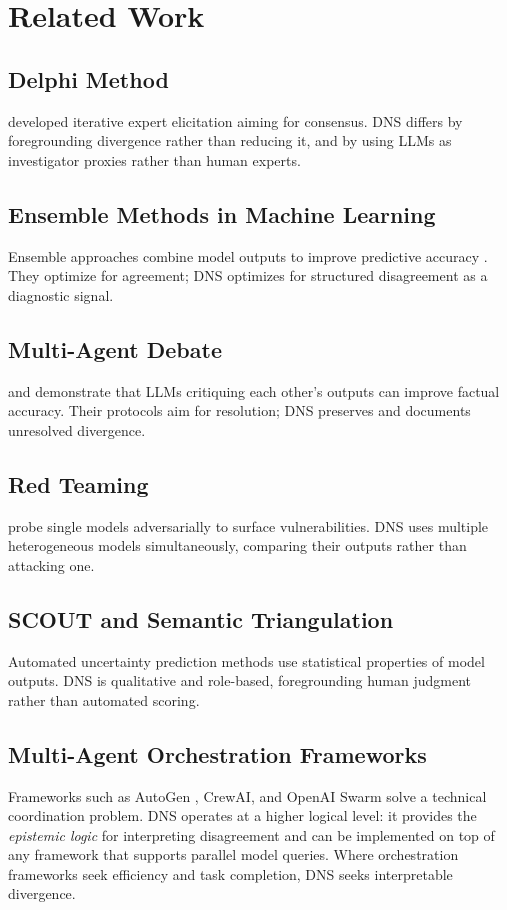 \documentclass[10pt,a4paper]{article}
\begin{document}
\section{Related Work}
\label{sec:related}

\subsection{Delphi Method}
\citet{dalkey1963} developed iterative expert elicitation aiming for consensus.
DNS differs by foregrounding divergence rather than reducing it, and by using LLMs
as investigator proxies rather than human experts.

\subsection{Ensemble Methods in Machine Learning}
Ensemble approaches combine model outputs to improve predictive accuracy
\citep{breiman1996}. They optimize for agreement; DNS optimizes for structured
disagreement as a diagnostic signal.

\subsection{Multi-Agent Debate}
\citet{Du2023} and \citet{Liang2024} demonstrate that LLMs critiquing each other's
outputs can improve factual accuracy. Their protocols aim for resolution; DNS
preserves and documents unresolved divergence.

\subsection{Red Teaming}
\citet{Perez2022} probe single models adversarially to surface vulnerabilities. DNS
uses multiple heterogeneous models simultaneously, comparing their outputs rather
than attacking one.

\subsection{SCOUT and Semantic Triangulation}
Automated uncertainty prediction methods \citep{xiong2024} use statistical
properties of model outputs. DNS is qualitative and role-based, foregrounding
human judgment rather than automated scoring.

\subsection{Multi-Agent Orchestration Frameworks}
Frameworks such as AutoGen \citep{wu2023autogen}, CrewAI, and OpenAI Swarm
solve a technical coordination problem. DNS operates at a higher logical level: it
provides the \textit{epistemic logic} for interpreting disagreement and can be
implemented on top of any framework that supports parallel model queries.
Where orchestration frameworks seek efficiency and task completion, DNS seeks
interpretable divergence.
\end{document}
